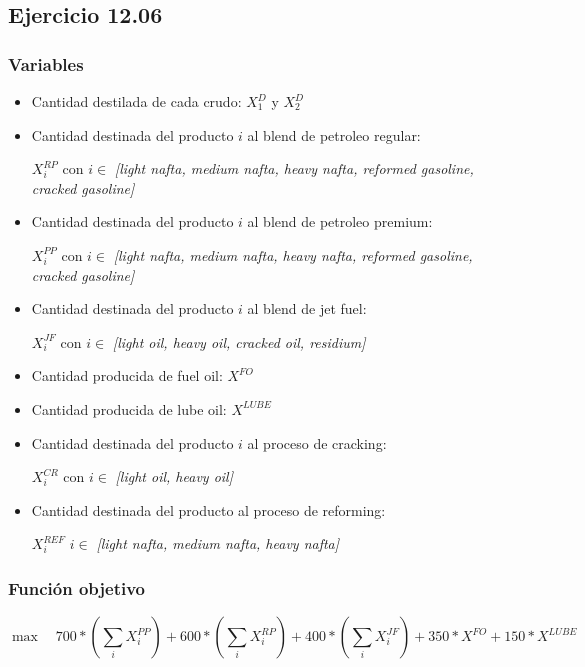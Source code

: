 
\subsection{Ejercicio 12.06}
\subsubsection{Variables}

\begin{itemize}
    \item Cantidad destilada de cada crudo: $X^D_1$ y $X^D_2$
    \item Cantidad destinada del producto $i$ al blend de petroleo regular:

    $X^{RP}_i$ con $i \in$ \emph{[light nafta, medium nafta, heavy nafta, reformed gasoline, cracked gasoline]}
    \item Cantidad destinada del producto $i$ al blend de petroleo premium:

    $X^{PP}_i$ con $i \in$ \emph{[light nafta, medium nafta, heavy nafta, reformed gasoline, cracked gasoline]}
    \item Cantidad destinada del producto $i$ al blend de jet fuel:

    $X^{JF}_i$ con $i \in$ \emph{[light oil, heavy oil, cracked oil, residium]}
    \item Cantidad producida de fuel oil: $X^{FO}$
    \item Cantidad producida de lube oil: $X^{LUBE}$
    \item Cantidad destinada del producto $i$ al proceso de cracking:

    $X^{CR}_i$ con $i \in$ \emph{[light oil, heavy oil]}
    \item Cantidad destinada del producto al proceso de reforming:

    $X^{REF}_{i}$ $i \in$ \emph{[light nafta, medium nafta, heavy nafta]}
\end{itemize}


\subsubsection{Función objetivo}
    $$ \max \quad 700*(\sum_{i} X^{PP}_i) + 600*(\sum_{i} X^{RP}_i) +
    400*(\sum_{i} X^{JF}_i) + 350*X^{FO} + 150*X^{LUBE} $$

